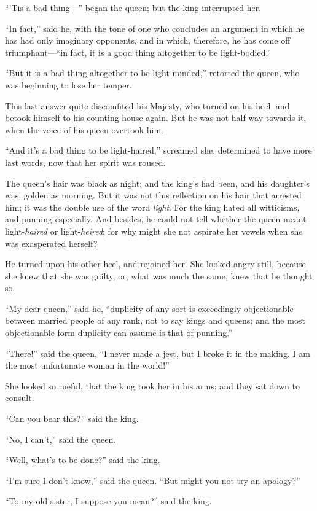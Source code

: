\documentclass[12pt]{memoir}
\begin{document}
``'Tis a bad thing---'' began the queen; but the king interrupted her.

``In fact,'' said he, with the tone of one who concludes an argument
in which he has had only imaginary opponents, and in which, therefore,
he has come off triumphant---``in fact, it is a good thing altogether
to be light-bodied.''

``But it is a bad thing altogether to be light-minded,'' retorted the
queen, who was beginning to lose her temper.

This last answer quite discomfited his Majesty, who turned on his
heel, and betook himself to his counting-house again.  But he was not
half-way towards it, when the voice of his queen overtook him.

``And it's a bad thing to be light-haired,'' screamed she, determined
to have more last words, now that her spirit was roused.

The queen's hair was black as night; and the king's had been, and his
daughter's was, golden as morning.  But it was not this reflection on
his hair that arrested him; it was the double use of the word
\emph{light}.  For the king hated all witticisms, and punning
especially.  And besides, he could not tell whether the queen meant
light-\emph{haired} or light-\emph{heired}; for why might she not
aspirate her vowels when she was exasperated herself?

He turned upon his other heel, and rejoined her.  She looked angry
still, because she knew that she was guilty, or, what was much the
same, knew that he thought so.

``My dear queen,'' said he, ``duplicity of any sort is exceedingly
objectionable between married people of any rank, not to say kings and
queens; and the most objectionable form duplicity can assume is that
of punning.''

``There!'' said the queen, ``I never made a jest, but I broke it in
the making.  I am the most unfortunate woman in the world!''

She looked so rueful, that the king took her in his arms; and they sat
down to consult.

``Can you bear this?'' said the king.

``No, I can't,'' said the queen.

``Well, what's to be done?'' said the king.

``I'm sure I don't know,'' said the queen.  ``But might you not try an
apology?''

``To my old sister, I suppose you mean?'' said the king.
\end{document}
